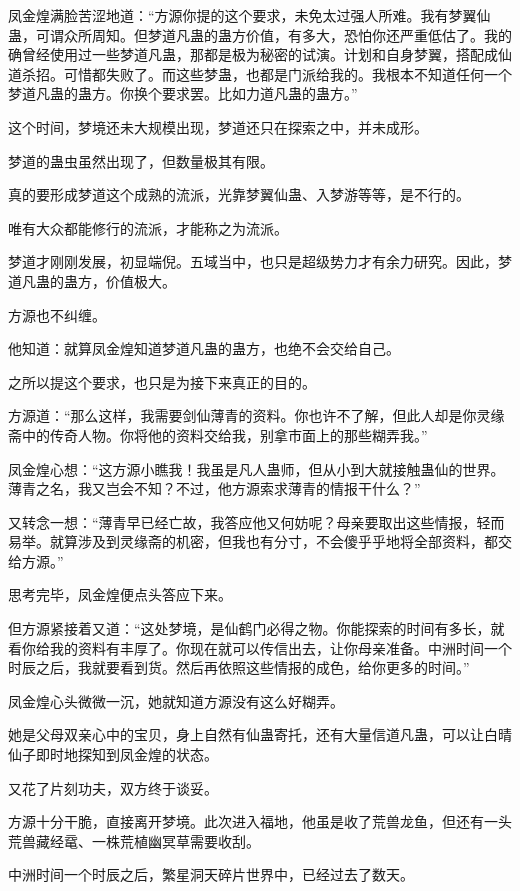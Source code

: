 \begin{this_body}
凤金煌满脸苦涩地道：“方源你提的这个要求，未免太过强人所难。我有梦翼仙蛊，可谓众所周知。但梦道凡蛊的蛊方价值，有多大，恐怕你还严重低估了。我的确曾经使用过一些梦道凡蛊，那都是极为秘密的试演。计划和自身梦翼，搭配成仙道杀招。可惜都失败了。而这些梦蛊，也都是门派给我的。我根本不知道任何一个梦道凡蛊的蛊方。你换个要求罢。比如力道凡蛊的蛊方。”

这个时间，梦境还未大规模出现，梦道还只在探索之中，并未成形。

梦道的蛊虫虽然出现了，但数量极其有限。

真的要形成梦道这个成熟的流派，光靠梦翼仙蛊、入梦游等等，是不行的。

唯有大众都能修行的流派，才能称之为流派。

梦道才刚刚发展，初显端倪。五域当中，也只是超级势力才有余力研究。因此，梦道凡蛊的蛊方，价值极大。

方源也不纠缠。

他知道：就算凤金煌知道梦道凡蛊的蛊方，也绝不会交给自己。

之所以提这个要求，也只是为接下来真正的目的。

方源道：“那么这样，我需要剑仙薄青的资料。你也许不了解，但此人却是你灵缘斋中的传奇人物。你将他的资料交给我，别拿市面上的那些糊弄我。”

凤金煌心想：“这方源小瞧我！我虽是凡人蛊师，但从小到大就接触蛊仙的世界。薄青之名，我又岂会不知？不过，他方源索求薄青的情报干什么？”

又转念一想：“薄青早已经亡故，我答应他又何妨呢？母亲要取出这些情报，轻而易举。就算涉及到灵缘斋的机密，但我也有分寸，不会傻乎乎地将全部资料，都交给方源。”

思考完毕，凤金煌便点头答应下来。

但方源紧接着又道：“这处梦境，是仙鹤门必得之物。你能探索的时间有多长，就看你给我的资料有丰厚了。你现在就可以传信出去，让你母亲准备。中洲时间一个时辰之后，我就要看到货。然后再依照这些情报的成色，给你更多的时间。”

凤金煌心头微微一沉，她就知道方源没有这么好糊弄。

她是父母双亲心中的宝贝，身上自然有仙蛊寄托，还有大量信道凡蛊，可以让白晴仙子即时地探知到凤金煌的状态。

又花了片刻功夫，双方终于谈妥。

方源十分干脆，直接离开梦境。此次进入福地，他虽是收了荒兽龙鱼，但还有一头荒兽藏经鼋、一株荒植幽冥草需要收刮。

中洲时间一个时辰之后，繁星洞天碎片世界中，已经过去了数天。


\end{this_body}

